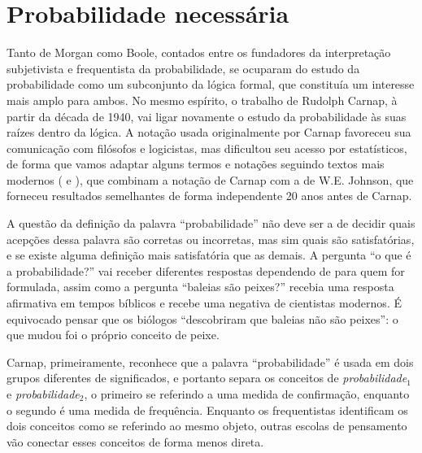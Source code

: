 \section{Probabilidade necessária}

Tanto de Morgan como Boole, contados entre os fundadores da interpretação subjetivista e frequentista da probabilidade,
se ocuparam do estudo da probabilidade como um subconjunto da lógica formal, que constituía um interesse mais amplo para
ambos. No mesmo espírito, o trabalho de Rudolph Carnap, à partir da década de 1940, vai ligar novamente o estudo da probabilidade
às suas raízes dentro da lógica. A notação usada originalmente por Carnap favoreceu sua comunicação com filósofos e logicistas,
mas dificultou seu acesso por estatísticos, de forma que vamos adaptar alguns termos e notações seguindo textos mais
modernos (\citep{Zabell09} e \citep{Fitelson07}), que combinam a notação de Carnap com a de W.E. Johnson, que forneceu
resultados semelhantes de forma independente 20 anos antes de Carnap. 

A questão da definição da palavra ``probabilidade'' não deve ser a de decidir quais acepções dessa palavra são
corretas ou incorretas, mas sim quais são satisfatórias, e se existe alguma definição mais satisfatória que as demais.
A pergunta ``o que é a probabilidade?''
vai receber diferentes respostas dependendo de para quem for formulada, assim como a pergunta ``baleias são peixes?''
recebia uma resposta afirmativa em tempos bíblicos e recebe uma negativa de cientistas modernos. É equivocado pensar que os
biólogos ``descobriram que baleias não são peixes'': o que mudou foi o próprio conceito de peixe. 

Carnap, primeiramente, reconhece que a palavra ``probabilidade'' é usada em
dois grupos diferentes de significados, e 
portanto separa os conceitos de {\em probabilidade$_1$} e {\em probabilidade$_2$}, o primeiro
se referindo a uma medida de confirmação, enquanto o segundo é uma medida de frequência.
Enquanto os frequentistas identificam os dois conceitos como se referindo ao mesmo objeto, outras escolas
de pensamento vão conectar esses conceitos de forma menos direta.

